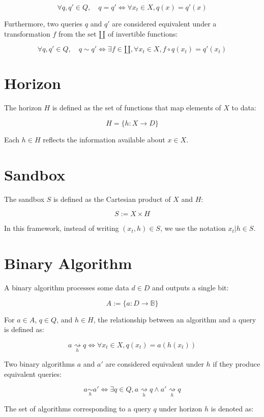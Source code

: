 \documentclass[11pt,a4paper]{article}
\theoremstyle{definition}
\theoremstyle{remark}
\numberwithin{equation}{section}
\begin{document}
\[
\forall q, q' \in Q, \quad q = q' \iff \forall x_t \in X, q(x) = q'(x)
\]

Furthermore, two queries $q$ and $q'$ are considered equivalent under a transformation $f$ from the set $\amalg$ of invertible functions:

\[
\forall q, q' \in Q, \quad q \sim q' \iff \exists f \in \amalg, \forall x_t \in X, f \circ q(x_t) = q'(x_t)
\]

\section{Horizon}

The horizon $H$ is defined as the set of functions that map elements of $X$ to data:

\[
H = \{ h : X \rightarrow D \}
\]

Each $h \in H$ reflects the information available about $x \in X$.

\section{Sandbox}

The sandbox $S$ is defined as the Cartesian product of $X$ and $H$:

\[
S := X \times H
\]

In this framework, instead of writing $(x_t, h) \in S$, we use the notation $x_t | h \in S$.

\section{Binary Algorithm}

A binary algorithm processes some data $d \in D$ and outputs a single bit:

\[
A := \{ a : D \rightarrow \mathbb{B} \}
\]

For $a \in A$, $q \in Q$, and $h \in H$, the relationship between an algorithm and a query is defined as:

\[
a \underset{h}{\rightsquigarrow} q \iff \forall x_t \in X, q(x_t) = a(h(x_t))
\]

Two binary algorithms $a$ and $a'$ are considered equivalent under $h$ if they produce equivalent queries:

\[
a \underset{h}{\sim} a' \iff \exists q \in Q , a \underset{h}{\rightsquigarrow}q \wedge a' \underset{h}{\rightsquigarrow}q
\]

The set of algorithms corresponding to a query $q$ under horizon $h$ is denoted as:
\end{document}
